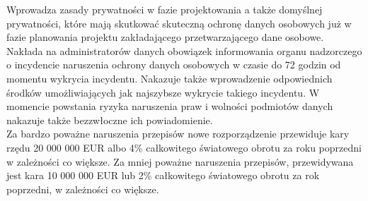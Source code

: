 \documentclass[en, noamssymb]{mgr}
\begin{document}
\indent Wprowadza zasady prywatności w fazie projektowania a także domyślnej prywatności, które mają skutkować skuteczną ochronę danych osobowych już w fazie planowania projektu zakładającego przetwarzającego dane osobowe.\\
\indent Nakłada na administratorów danych obowiązek informowania organu nadzorczego o incydencie naruszenia ochrony danych osobowych w czasie do 72 godzin od momentu wykrycia incydentu. Nakazuje także wprowadzenie odpowiednich środków umożliwiających jak najszybsze wykrycie takiego incydentu. W momencie powstania ryzyka naruszenia praw i wolności podmiotów danych nakazuje także bezzwłoczne ich powiadomienie.\\
\indent Za bardzo poważne naruszenia przepisów nowe rozporządzenie przewiduje kary rzędu 20 000 000 EUR albo 4\% całkowitego światowego obrotu za roku poprzedni w zależności co większe. Za mniej poważne naruszenia przepisów, przewidywana jest kara 10 000 000 EUR lub 2\% całkowitego światowego obrotu za rok poprzedni, w zależności co większe.\\ \\
\end{document}
